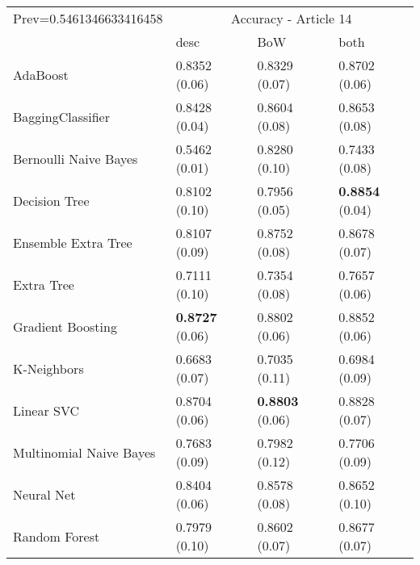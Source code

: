 \begin{tabular}{|l|l|l|l| }
\hline
Prev=0.5461346633416458 &  \multicolumn{3}{c|}{Accuracy - Article 14} \\
\cline{2-4} & desc & BoW & both \\ \hline
AdaBoost                & 0.8352 (0.06) & 0.8329 (0.07) & 0.8702 (0.06)\\
BaggingClassifier       & 0.8428 (0.04) & 0.8604 (0.08) & 0.8653 (0.08)\\
Bernoulli Naive Bayes   & 0.5462 (0.01) & 0.8280 (0.10) & 0.7433 (0.08)\\
Decision Tree           & 0.8102 (0.10) & 0.7956 (0.05) & {\bf 0.8854} (0.04)\\
Ensemble Extra Tree     & 0.8107 (0.09) & 0.8752 (0.08) & 0.8678 (0.07)\\
Extra Tree              & 0.7111 (0.10) & 0.7354 (0.08) & 0.7657 (0.06)\\
Gradient Boosting       & {\bf 0.8727} (0.06) & 0.8802 (0.06) & 0.8852 (0.06)\\
K-Neighbors             & 0.6683 (0.07) & 0.7035 (0.11) & 0.6984 (0.09)\\
Linear SVC              & 0.8704 (0.06) & {\bf 0.8803} (0.06) & 0.8828 (0.07)\\
Multinomial Naive Bayes & 0.7683 (0.09) & 0.7982 (0.12) & 0.7706 (0.09)\\
Neural Net              & 0.8404 (0.06) & 0.8578 (0.08) & 0.8652 (0.10)\\
Random Forest           & 0.7979 (0.10) & 0.8602 (0.07) & 0.8677 (0.07)\\
\hline
\end{tabular}
